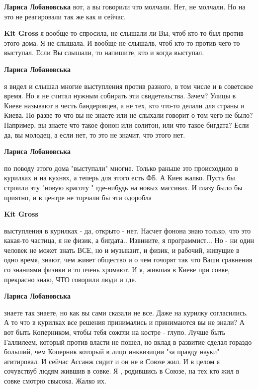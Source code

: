 \begin{itemize}
\begin{itemize}
\begin{itemize}
\textbf{Лариса Лобановська} вот, а вы говорили что молчали. Нет, не молчали. Но на это не реагировали так же как и сейчас.

\textbf{Kit Gross} я вообще-то спросила, не слышали ли Вы, чтоб кто-то был против этого дома. Я не слышала. И вообще не слышалв, чтоб кто-то против чего-то выступал. Если Вы слышали, то напишите, кто и когда выступал.

\textbf{Лариса Лобановська} 

я видел и слышал многие выступления против разного, в том числе и в советское
время. Но я не считал нужным собирать эти свидетельства. Зачем? Улицы в Киеве
называют в честь бандеровцев, а не тех, кто что-то делали для страны и Киева.
Но разве то что вы не знаете или не слыхали говорит о том чего не было?
Например, вы знаете что такое фонон или солитон, или что такое бигдата? Если
да, вы молодец, а если нет, то это не значит, что этого нет.

\textbf{Лариса Лобановська} 

по поводу этого дома "выступали" многие. Только раньше это происходило в
курилках и на кухнях, а теперь для этого есть ФБ. А Киев жалко. Пусть бы
строили эту "новую красоту " где-нибудь на новых массивах. И глазу было бы
приятно, и в центре не торчали бы эти одоробла

\textbf{Kit Gross} 

выступления в курилках - да, открыто - нет. Насчет фонона знаю только, что это
какая-то частица, я не физик, а бигдата.. Извините, я программист... Но - ни
один человек не может знать ВСЕ, но и музыкант, и физик, и рабочий, живущие в
одно время, знают, чем живет общество и о чем гочорят так что Ваши сравнения со
знаниями физики и тп очень хромают. И я, жившая в Киеве при совке, прекрасно
знаю, ЧТО говорили люди и где.

\textbf{Лариса Лобановська} 

знаете так знаете, но как вы сами сказали не все. Даже на курилку согласились.
А то что в курилках все решения принимались и принимаются вы не знали? А вот
быть Коперником, чтобы тебя сожгли на костре - глупо. Лучше быть Галлилеем,
который против власти не пошел, но вклад в развитие сделал гораздо больший, чем
Коперник который в лицо инквизиции "за правду науки" агитировал. И сейчас
Ассанж сидит и он не в Союзе жил. И в целом я сочувствуб людям жившив в совке.
Я , родившись в Союзе, на тех кто жил в совке смотрю свысока. Жалко их.


\end{itemize}
\end{itemize}
\end{itemize}
